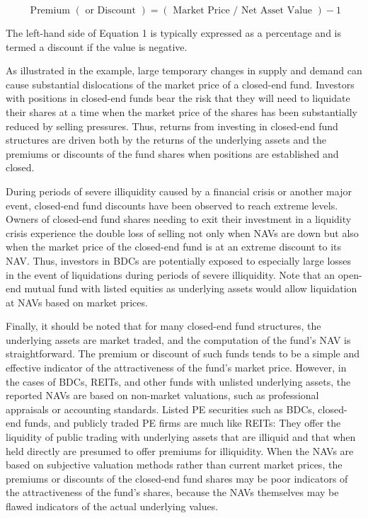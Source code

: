 \documentclass[11pt]{article}
\begin{document}
\begin{equation*}
\text { Premium }(\text { or Discount })=(\text { Market Price } / \text { Net Asset Value })-1 \tag{1}
\end{equation*}


The left-hand side of Equation 1 is typically expressed as a percentage and is termed a discount if the value is negative.

As illustrated in the example, large temporary changes in supply and demand can cause substantial dislocations of the market price of a closed-end fund. Investors with positions in closed-end funds bear the risk that they will need to liquidate their shares at a time when the market price of the shares has been substantially reduced by selling pressures. Thus, returns from investing in closed-end fund structures are driven both by the returns of the underlying assets and the premiums or discounts of the fund shares when positions are established and closed.

During periods of severe illiquidity caused by a financial crisis or another major event, closed-end fund discounts have been observed to reach extreme levels. Owners of closed-end fund shares needing to exit their investment in a liquidity crisis experience the double loss of selling not only when NAVs are down but also when the market price of the closed-end fund is at an extreme discount to its NAV. Thus, investors in BDCs are potentially exposed to especially large losses in the event of liquidations during periods of severe illiquidity. Note that an open-end mutual fund with listed equities as underlying assets would allow liquidation at NAVs based on market prices.

Finally, it should be noted that for many closed-end fund structures, the underlying assets are market traded, and the computation of the fund's NAV is straightforward. The premium or discount of such funds tends to be a simple and effective indicator of the attractiveness of the fund's market price. However, in the cases of BDCs, REITs, and other funds with unlisted underlying assets, the reported NAVs are based on non-market valuations, such as professional appraisals or accounting standards. Listed PE securities such as BDCs, closed-end funds, and publicly traded PE firms are much like REITs: They offer the liquidity of public trading with underlying assets that are illiquid and that when held directly are presumed to offer premiums for illiquidity. When the NAVs are based on subjective valuation methods rather than current market prices, the premiums or discounts of the closed-end fund shares may be poor indicators of the attractiveness of the fund's shares, because the NAVs themselves may be flawed indicators of the actual underlying values.
\end{document}
